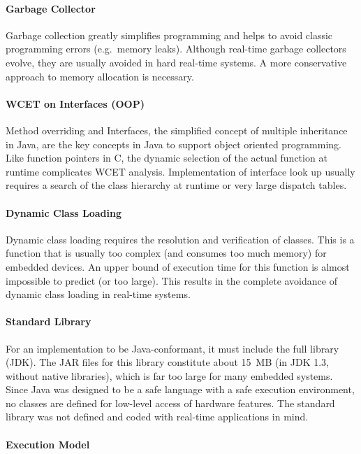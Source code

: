 \paragraph{Garbage Collector}

Garbage collection greatly simplifies programming and helps to avoid
classic programming errors (e.g.\ memory leaks). Although real-time
garbage collectors evolve, they are usually avoided in hard
real-time systems. A more conservative approach to memory allocation
is necessary.

\paragraph{WCET on Interfaces (OOP)}

Method overriding and Interfaces, the simplified concept of multiple
inheritance in Java, are the key concepts in Java to support object
oriented programming. Like function pointers in C, the dynamic
selection of the actual function at runtime complicates WCET
analysis. Implementation of interface look up usually requires a
search of the class hierarchy at runtime or very large dispatch
tables.

\paragraph{Dynamic Class Loading}

Dynamic class loading requires the resolution and verification of
classes. This is a function that is usually too complex (and
consumes too much memory) for embedded devices. An upper bound of
execution time for this function is almost impossible to predict (or
too large). This results in the complete avoidance of dynamic class
loading in real-time systems.

\paragraph{Standard Library}

For an implementation to be Java-conformant, it must include the
full library (JDK). The JAR files for this library constitute about
15~MB (in JDK 1.3, without native libraries), which is far too large
for many embedded systems. Since Java was designed to be a safe
language with a safe execution environment, no classes are defined
for low-level access of hardware features. The standard library was
not defined and coded with real-time applications in mind.

\paragraph{Execution Model}


